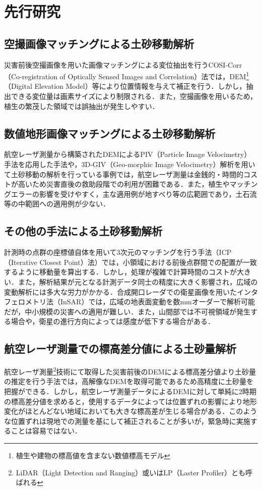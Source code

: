   \section{先行研究}
    \subsection*{空撮画像マッチングによる土砂移動解析}
      災害前後空撮画像を用いた画像マッチングによる変位抽出を行うCOSI-Corr（Co-registration of Optically Sensed Images and Correlation）法\cite{土砂移動解析1}では，DEM\footnote{植生や建物の標高値を含まない数値標高モデル}（Digital Elevation Model）等により位置情報を与えて補正を行う．しかし，抽出できる変位量は画素サイズにより制限される．また，空撮画像を用いるため，植生の繁茂した領域では誤抽出が発生しやすい．


    \subsection*{数値地形画像マッチングによる土砂移動解析}
      航空レーザ測量から構築されたDEMによるPIV（Particle Image Velocimetry）手法\cite{土砂移動解析2}を応用した手法や，3D-GIV（Geo-morphic Image Velocimetry）解析\cite{土砂移動解析3, 土砂移動解析4, 土砂移動解析5}を用いて土砂移動の解析を行っている事例では，航空レーザ測量は金銭的・時間的コストが高いため災害直後の救助段階での利用が困難である．また，植生やマッチングエラーの影響を受けやすく，主な適用例が地すべり等の広範囲であり，土石流等の中範囲への適用例が少ない．
      

    \subsection*{その他の手法による土砂移動解析}
      計測時の点群の座標値自体を用いて3次元のマッチングを行う手法（ICP（Iterative Closest Point）法）\cite{土砂移動解析5}では，小領域における前後点群間での配置が一致するように移動量を算出する．しかし，処理が複雑で計算時間のコストが大きい．また，解析結果が元となる計測データ同士の精度に大きく影響され，広域の変動解析には多大な労力がかかる．合成開口レーダでの衛星画像を用いたインタフェロメトリ法（InSAR）\cite{土砂移動解析6}では，広域の地表面変動を数mmオーダーで解析可能だが，中小規模の災害への適用が難しい．また，山間部では不可視領域が発生する場合や，衛星の進行方向によっては感度が低下する場合がある．


    \subsection*{航空レーザ測量での標高差分値による土砂量解析}
      \label{}
      航空レーザ測量\footnote{LiDAR（Light Detection and Ranging）或いはLP（Laster Profiler）とも呼ばれる}技術にて取得した災害前後のDEMによる標高差分値より土砂量の推定を行う手法\cite{土砂量解析1, 土砂量解析2}では，高解像なDEMを取得可能であるため高精度に土砂量を把握ができる．しかし，航空レーザ測量データによるDEMに対して単純に2時期の標高差分値を求めると，使用するデータによっては位置ずれの影響により地形変化がほとんどない地域においても大きな標高差が生じる場合がある．このような位置ずれは現地での測量を基にして補正されることが多いが，緊急時に実施することは容易ではない．


